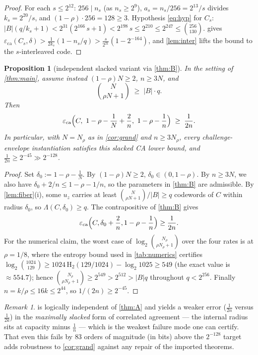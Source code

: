 \documentclass[11pt]{article}
\newtheorem{proposition}[theorem]{Proposition}
\theoremstyle{definition}
\theoremstyle{remark}
\newtheorem{remark}[theorem]{Remark}
\newcommand{\B}{B}
\newcommand{\eca}{\varepsilon_{\mathrm{ca}}}
\newcommand{\Lst}{\Lambda}
\newcommand{\Hb}{\mathrm{H}_2}
\begin{document}
\begin{proof}
For each $s\le2^{12}$: $256\mid n_s$ (as $n_s\ge2^9$), $a_s=n_s/256=2^{13}/s$ divides $k_s=2^{20}/s$, and $(1-\rho)\cdot256=128\ge3$. Hypothesis \eqref{eq:hyp} for $C_s$: $|\B|(q/k_s+1)<2^{31}(2^{166}\,s+1)<2^{198}\,s\le2^{210}\le2^{247}\le\binom{256}{130}$.  gives $\eca(C_s,\delta)>\frac1{2k_s}(1-n_s/q)>\frac s{2^{21}}(1-2^{-164})$, and \cref{lem:inter} lifts the bound to the $s$-interleaved code.
\end{proof}

\begin{proposition}[independent slacked variant via \cref{thm:B}]\label{prop:slacked}
In the setting of \cref{thm:main}, assume instead $(1-\rho)N\ge2$, $n\ge3N$, and
\[
\binom{N}{\rho N+1}\;\ge\;|\B|\cdot q .
\]
Then
\[
\eca\Bigl(C,\ 1-\rho-\frac1N+\frac2n,\ 1-\rho-\frac1n\Bigr)\;\ge\;\frac1{2n}.
\]
In particular, with $N=N_\rho$ as in \cref{cor:grand} and $n\ge3N_\rho$, every challenge-envelope instantiation satisfies this slacked CA lower bound, and $\frac1{2n}\ge2^{-45}\gg2^{-128}$.
\end{proposition}

\begin{proof}
Set $\delta_0:=1-\rho-\frac1N$. By $(1-\rho)N\ge2$, $\delta_0\in(0,1-\rho)$. By $n\ge3N$, we also have $\delta_0+2/n\le1-\rho-1/n$, so the parameters in \cref{thm:B} are admissible. By \cref{lem:fiber}(i), some $u_z$ carries at least $\binom N{\rho N+1}/|\B|\ge q$ codewords of $C$ within radius $\delta_0$, so $\Lst(C,\delta_0)\ge q$. The contrapositive of \cref{thm:B} gives
\[
\eca\Bigl(C,\delta_0+\frac2n,1-\rho-\frac1n\Bigr)\ge\frac1{2n}.
\]
For the numerical claim, the worst case of $\log_2\binom{N_\rho}{\rho N_\rho+1}$ over the four rates is at $\rho=1/8$, where the entropy bound used in \cref{tab:numerics} certifies $\log_2\binom{1024}{129}\ge1024\,\Hb(129/1024)-\log_2 1025\ge549$ (the exact value is $\approx554.7$); hence $\binom{N_\rho}{\rho N_\rho+1}\ge2^{549}>2^{512}>|\B|q$ throughout $q<2^{256}$. Finally $n=k/\rho\le16k\le2^{44}$, so $1/(2n)\ge2^{-45}$.
\end{proof}

\begin{remark}
 is logically independent of \cref{thm:A} and yields a weaker error ($\frac1{2n}$ versus $\frac1{2k}$) in the \emph{maximally slacked} form of correlated agreement --- the internal radius sits at capacity minus $\frac1n$ --- which is the weakest failure mode one can certify. That even this fails by $83$ orders of magnitude (in bits) above the $2^{-128}$ target adds robustness to \cref{cor:grand} against any repair of the imported theorems.
\end{remark}
\end{document}
